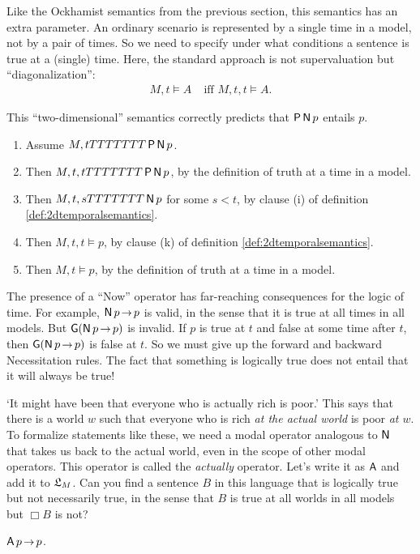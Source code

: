 Like the Ockhamist semantics from the previous section, this semantics has an
extra parameter. An ordinary scenario is represented by a single time in a
model, not by a pair of times. So we need to specify under what
conditions a sentence is true at a (single) time. Here, the standard approach is
not supervaluation but ``diagonalization'':
\begin{align*}
  M,t \models A & \;\text{iff $M,t,t \models A$}.
\end{align*}

This ``two-dimensional'' semantics correctly predicts that $\operatorname{\mathsf{P}}\operatorname{\mathsf{N}} p$ entails $p$.
\begin{enumerate}[leftmargin=10mm]
  \itemsep-1mm
\item Assume $M,t TTTTTTT \operatorname{\mathsf{P}}\operatorname{\mathsf{N}} p$.
\item Then $M,t,t TTTTTTT \operatorname{\mathsf{P}}\operatorname{\mathsf{N}} p$, by the definition of truth at a time in a model.
\item Then $M,t,s TTTTTTT \operatorname{\mathsf{N}} p$ for some $s<t$, by clause (i) of definition \ref{def:2dtemporalsemantics}.
\item Then $M,t,t \models p$, by clause (k) of definition \ref{def:2dtemporalsemantics}.
\item Then $M,t \models p$, by the definition of truth at a time in a model.
\end{enumerate}

The presence of a ``Now'' operator has far-reaching consequences for the logic
of time. For example, $\tN p \to p$ is valid, in the sense that it is true at
all times in all models. But $\tG(\tN p \to p)$ is invalid. If $p$ is true at
$t$ and false at some time after $t$, then $\tG(\tN p \to p)$ is false at $t$.
So we must give up the forward and backward Necessitation rules. The fact that
something is logically true does not entail that it will always be true!

\begin{exercise}
  `It might have been that everyone who is actually rich is poor.' This says
  that there is a world $w$ such that everyone who is rich \emph{at the actual
    world} is poor \emph{at $w$}. To formalize statements like these, we need a
  modal operator analogous to $\operatorname{\mathsf{N}}$ that takes us back to the actual world, even
  in the scope of other modal operators. This operator is called the
  \emph{actually} operator. Let's write it as $\operatorname{\mathsf{A}}$ and add it to $\mathfrak{L}_{M}$. Can
  you find a sentence $B$ in this language that is logically true but not
  necessarily true, in the sense that $B$ is true at all worlds in all models
  but $\Box B$ is not?
\end{exercise}
\begin{solution}
  $\tA p \to p$.
\end{solution}

